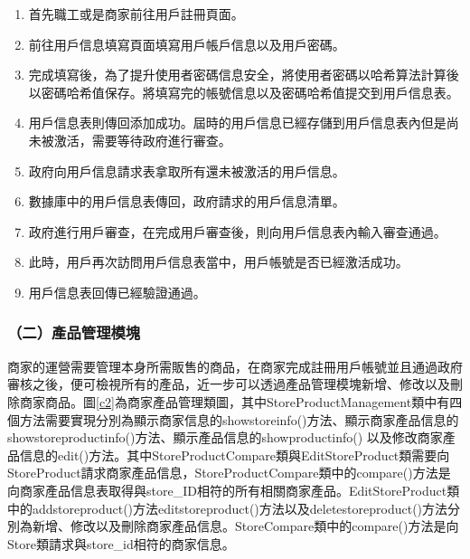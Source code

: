 	\begin{enumerate}
	\item 首先職工或是商家前往用戶註冊頁面。
	\item 前往用戶信息填寫頁面填寫用戶帳戶信息以及用戶密碼。
	\item 完成填寫後，為了提升使用者密碼信息安全，將使用者密碼以哈希算法計算後以密碼哈希值保存。將填寫完的帳號信息以及密碼哈希值提交到用戶信息表。
	\item 用戶信息表則傳回添加成功。屆時的用戶信息已經存儲到用戶信息表內但是尚未被激活，需要等待政府進行審查。
	\item 政府向用戶信息請求表拿取所有還未被激活的用戶信息。
	\item 數據庫中的用戶信息表傳回，政府請求的用戶信息清單。
	\item 政府進行用戶審查，在完成用戶審查後，則向用戶信息表內輸入審查通過。
	\item 此時，用戶再次訪問用戶信息表當中，用戶帳號是否已經激活成功。
	\item 用戶信息表回傳已經驗證通過。
	\end{enumerate}


\subsubsection{（二）產品管理模塊}
商家的運營需要管理本身所需販售的商品，在商家完成註冊用戶帳號並且通過政府審核之後，便可檢視所有的產品，近一步可以透過產品管理模塊新增、修改以及刪除商家商品。圖\ref{c2}為商家產品管理類圖，其中StoreProductManagement類中有四個方法需要實現分別為顯示商家信息的showstoreinfo()方法、顯示商家產品信息的showstoreproductinfo()方法、顯示產品信息的showproductinfo()
以及修改商家產品信息的edit()方法。其中StoreProductCompare類與EditStoreProduct類需要向StoreProduct請求商家產品信息，StoreProductCompare類中的compare()方法是向商家產品信息表取得與store\_ID相符的所有相關商家產品。EditStoreProduct類中的addstoreproduct()方法editstoreproduct()方法以及deletestoreproduct()方法分別為新增、修改以及刪除商家產品信息。StoreCompare類中的compare()方法是向Store類請求與store\_id相符的商家信息。

